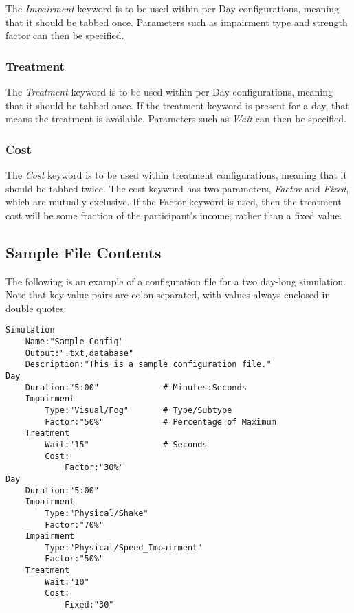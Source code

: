 \documentclass{article}
\begin{document}
The \textit{Impairment} keyword is to be used within per-Day configurations, meaning that it should be tabbed once. Parameters such as impairment type and strength factor can then be specified. 

\subsubsection*{Treatment}

The \textit{Treatment} keyword is to be used within per-Day configurations, meaning that it should be tabbed once. If the treatment keyword is present for a day, that means the treatment is available. Parameters such as \textit{Wait} can then be specified.

\subsubsection*{Cost}

The \textit{Cost} keyword is to be used within treatment configurations, meaning that it should be tabbed twice. The cost keyword has two parameters, \textit{Factor} and \textit{Fixed}, which are mutually exclusive. If the Factor keyword is used, then the treatment cost will be some fraction of the participant's income, rather than a fixed value.

\subsection*{Sample File Contents}
The following is an example of a configuration file for a two day-long simulation. Note that key-value pairs are colon separated, with values always enclosed in double quotes. 

\begin{lstlisting}
Simulation
    Name:"Sample_Config"
    Output:".txt,database"
    Description:"This is a sample configuration file."	
Day
    Duration:"5:00"             # Minutes:Seconds
    Impairment
        Type:"Visual/Fog"       # Type/Subtype
        Factor:"50%"            # Percentage of Maximum
    Treatment
        Wait:"15"               # Seconds
        Cost:
            Factor:"30%"
Day
    Duration:"5:00"
    Impairment
        Type:"Physical/Shake"
        Factor:"70%"
    Impairment
        Type:"Physical/Speed_Impairment"
        Factor:"50%"
    Treatment
        Wait:"10"               
        Cost:
            Fixed:"30"
\end{lstlisting}


%



\end{document}
